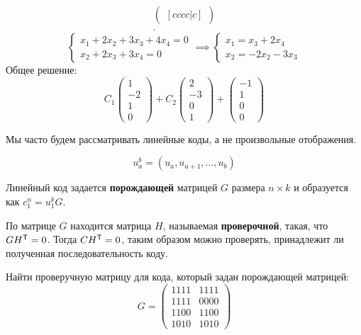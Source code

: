 \begin{example}
\begin{align*}
\begin{pmatrix}[cccc|c]
            \end{pmatrix} \\
        .\end{align*}
    \[\begin{cases}
        x_1 + 2x_2 + 3x_3 + 4x_4 = 0 \\
        x_2 + 2x_3 + 3x_4 = 0
    \end{cases} \implies \begin{cases}
        x_1 = x_3 + 2x_4 \\
        x_2 = -2x_2 - 3x_3
    \end{cases}\]
    Общее решение:
    \[
        C_1 \begin{pmatrix} 1 \\ -2 \\ 1 \\ 0 \end{pmatrix}
        + C_2 \begin{pmatrix} 2 \\ -3 \\ 0 \\ 1 \end{pmatrix}
        + \begin{pmatrix} -1 \\ 1 \\ 0 \\ 0 \end{pmatrix}
    \]
\end{example}

Мы часто будем рассматривать линейные коды, а не произвольные отображения.

\begin{notation}
    \[u_a^b = (u_a, u_{a + 1}, \ldots, u_b)\]
\end{notation}

Линейный код задается \textbf{порождающей} матрицей \(G\) размера \(n \times k\) и образуется как \(c_1^n = u_1^k G\).

По матрице \(G\) находится матрица \(H\), называемая \textbf{проверочной}, такая, что \(G H^{\mathsf{T}} = 0\). Тогда \(C H^{\mathsf{T}} = 0\), таким образом можно проверять, принадлежит ли полученная последовательность коду.

\begin{example}
    Найти проверучную матрицу для кода, который задан порождающей матрицей:
    \[G = \begin{pmatrix} 1111 & 1111 \\ 1111 & 0000 \\ 1100 & 1100 \\ 1010 & 1010 \end{pmatrix}\]

\end{example}

